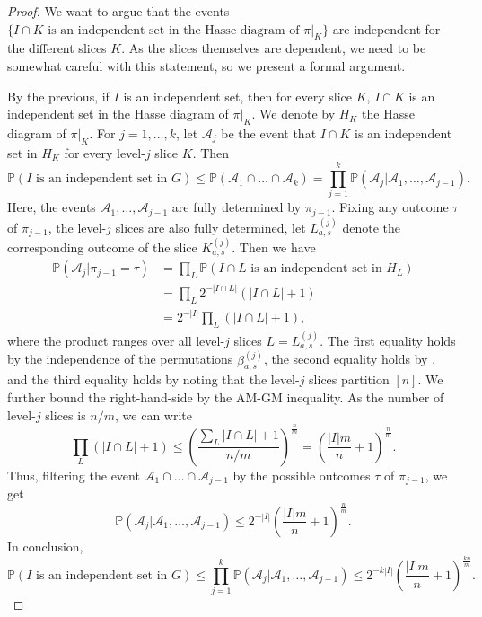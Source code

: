 \documentclass[11pt]{article}
\theoremstyle{definition}
\begin{document}
\begin{proof}
We want to argue that the events $\{I\cap K\text{ is an independent set in the Hasse diagram of }\pi|_K\}$ are independent for the different slices $K$. As the slices themselves are dependent, we need to be somewhat careful with this statement, so we present a formal argument. 

By the previous, if $I$ is an independent set, then for every slice $K$, $I\cap K$ is an independent set in the Hasse diagram of $\pi|_{K}$. We denote by $H_K$ the Hasse diagram of $\pi|_{K}$. For $j=1,\dots,k$, let $\mathcal{A}_j$ be the event that $I\cap K$ is an independent set in $H_K$ for every level-$j$ slice $K$. Then
$$\mathbb{P}(I\text{ is an independent set in }G)\leq \mathbb{P}(\mathcal{A}_1\cap\dots\cap\mathcal{A}_k)=\prod_{j=1}^{k}\mathbb{P}(\mathcal{A}_j|\mathcal{A}_1,\dots,\mathcal{A}_{j-1}).$$
Here, the events $\mathcal{A}_1,\dots,\mathcal{A}_{j-1}$ are fully determined by $\pi_{j-1}$. Fixing any outcome $\tau$ of $\pi_{j-1}$, the level-$j$ slices are also fully determined, let $L_{a,s}^{(j)}$ denote the corresponding outcome of the slice $K_{a,s}^{(j)}$. Then we have
\begin{align*}
    \mathbb{P}(\mathcal{A}_j|\pi_{j-1}=\tau)&=\prod_{L} \mathbb{P}(I\cap L\text{ is an independent set in }H_{L})\\
    &=\prod_{L}  2^{-|I\cap L|}(|I\cap L|+1)\\
    &=2^{-|I|}\prod_{L}(|I\cap L|+1),
\end{align*}
where the product ranges over all level-$j$ slices $L=L_{a,s}^{(j)}$. The first equality holds by the independence of the permutations $\beta^{(j)}_{a,s}$, the second equality holds by , and the third equality holds by noting that the level-$j$ slices partition $[n]$. We further bound the right-hand-side by the AM-GM inequality. As the number of level-$j$ slices is $n/m$, we can write
$$\prod_{L}(|I\cap L|+1)\leq \left(\frac{\sum_{L} |I\cap L|+1}{n/m}\right)^{\frac{n}{m}}=\left(\frac{|I|m}{n}+1\right)^{\frac{n}{m}}.$$
Thus, filtering the event $\mathcal{A}_1\cap\dots\cap\mathcal{A}_{j-1}$ by the possible outcomes $\tau$ of $\pi_{j-1}$, we get
$$\mathbb{P}(\mathcal{A}_j|\mathcal{A}_1,\dots,\mathcal{A}_{j-1})\leq 2^{-|I|} \left(\frac{|I|m}{n}+1\right)^{\frac{n}{m}}.$$
In conclusion,
$$\mathbb{P}(I\text{ is an independent set in }G)\leq\prod_{j=1}^{k}\mathbb{P}(\mathcal{A}_j|\mathcal{A}_1,\dots,\mathcal{A}_{j-1})\leq 2^{-k|I|} \left(\frac{|I|m}{n}+1\right)^{\frac{kn}{m}}.$$
\end{proof}
\end{document}
